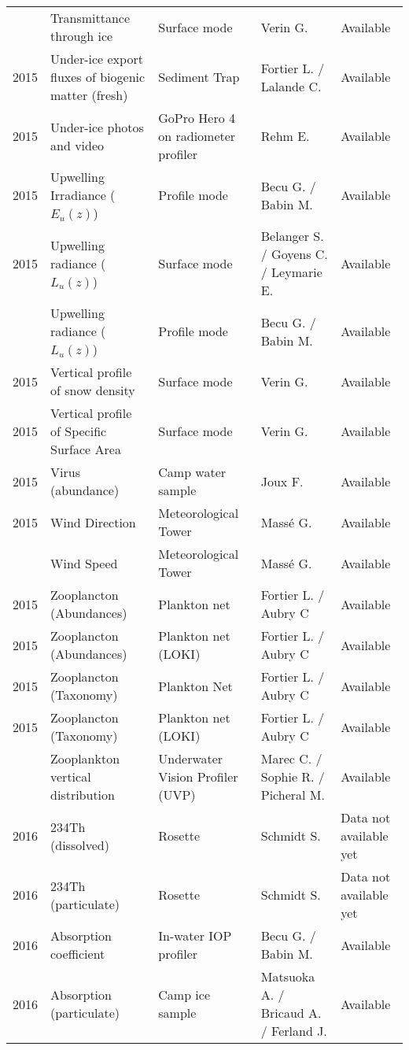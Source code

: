 \documentclass[]{article}
\begin{document}
\begin{landscape}
\begin{longtable}{rllll}
\addlinespace
2015 & Transmittance through ice & Surface mode & Verin G. & Available\\
2015 & Under-ice export fluxes of biogenic matter (fresh) & Sediment Trap & Fortier L. / Lalande C. & Available\\
2015 & Under-ice photos and video & GoPro Hero 4 on radiometer profiler & Rehm E. & Available\\
2015 & Upwelling Irradiance ($E_u(z)$) & Profile mode & Becu G. / Babin M. & Available\\
2015 & Upwelling radiance ($L_u(z)$) & Surface mode & Belanger S. / Goyens C. / Leymarie E. & Available\\
\addlinespace
2015 & Upwelling radiance ($L_u(z)$) & Profile mode & Becu G. / Babin M. & Available\\
2015 & Vertical profile of snow density & Surface mode & Verin G. & Available\\
2015 & Vertical profile of Specific Surface Area & Surface mode & Verin G. & Available\\
2015 & Virus (abundance) & Camp water sample & Joux F. & Available\\
2015 & Wind Direction & Meteorological Tower & Massé G. & Available\\
\addlinespace
2015 & Wind Speed & Meteorological Tower & Massé G. & Available\\
2015 & Zooplancton (Abundances) & Plankton net & Fortier L. / Aubry C & Available\\
2015 & Zooplancton (Abundances) & Plankton net (LOKI) & Fortier L. / Aubry C & Available\\
2015 & Zooplancton (Taxonomy) & Plankton Net & Fortier L. / Aubry C & Available\\
2015 & Zooplancton (Taxonomy) & Plankton net (LOKI) & Fortier L. / Aubry C & Available\\
\addlinespace
2015 & Zooplankton vertical distribution & Underwater Vision Profiler (UVP) & Marec C. / Sophie R. / Picheral M. & Available\\
2016 & 234Th (dissolved) & Rosette & Schmidt S. & Data not available yet\\
2016 & 234Th (particulate) & Rosette & Schmidt S. & Data not available yet\\
2016 & Absorption coefficient & In-water IOP profiler & Becu G. / Babin M. & Available\\
2016 & Absorption (particulate) & Camp ice sample & Matsuoka A. / Bricaud A. / Ferland J. & Available\\

\end{longtable}
\end{landscape}
\end{document}
